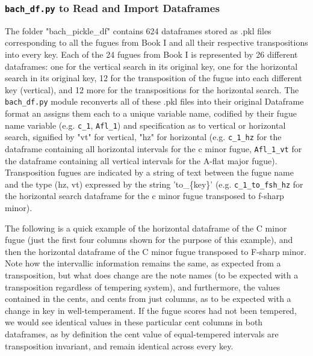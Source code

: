 \subsubsection{\texorpdfstring{\texttt{bach\_df.py} to Read and Import
Dataframes}{bach\_df.py to Read and Import Dataframes}}\label{bach_df.py-to-read-and-import-dataframes}

The folder "bach\_pickle\_df" contains 624 dataframes stored as .pkl
files corresponding to all the fugues from Book I and all their
respective transpositions into every key. Each of the 24 fugues from
Book I is represented by 26 different dataframes: one for the vertical
search in its original key, one for the horizontal search in its
original key, 12 for the transposition of the fugue into each different
key (vertical), and 12 more for the transpositions for the horizontal
search. The \texttt{bach\_df.py} module reconverts all of these .pkl
files into their original Dataframe format an assigns them each to a
unique variable name, codified by their fugue name variable (e.g.
\texttt{c\_1}, \texttt{Afl\_1}) and specification as to vertical or
horizontal search, signified by "vt" for vertical, "hz" for horizontal
(e.g. \texttt{c\_1\_hz} for the dataframe containing all horizontal
intervals for the c minor fugue, \texttt{Afl\_1\_vt} for the dataframe
containing all vertical intervals for the A-flat major fugue).
Transposition fugues are indicated by a string of text between the fugue
name and the type (hz, vt) expressed by the string 'to\_\{key\}' (e.g.
\texttt{c\_1\_to\_fsh\_hz} for the horizontal search dataframe for the c
minor fugue transposed to f-sharp minor).

The following is a quick example of the horizontal dataframe of the C
minor fugue (just the first four columns shown for the purpose of this
example), and then the horizontal dataframe of the C minor fugue
transposed to F-sharp minor. Note how the intervallic information
remains the same, as expected from a transposition, but what does change
are the note names (to be expected with a transposition regardless of
tempering system), and furthermore, the values contained in the cents,
and cents from just columns, as to be expected with a change in key in
well-temperament. If the fugue scores had not been tempered, we would
see identical values in these particular cent columns in both
dataframes, as by definition the cent value of equal-tempered intervals
are transposition invariant, and remain identical across every key.


